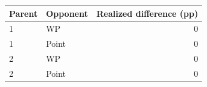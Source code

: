\begin{tabular}{llr}
\toprule
Parent & Opponent & Realized difference (pp) \\
\midrule
1 & WP & 0 \\
1 & Point & 0 \\
2 & WP & 0 \\
2 & Point & 0 \\
\bottomrule
\end{tabular}
